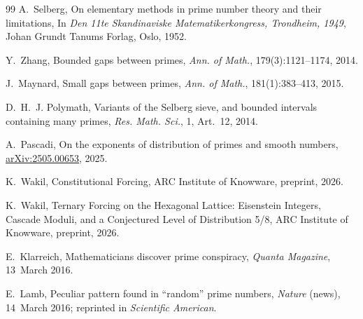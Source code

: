 \documentclass[12pt,a4paper]{article}
\theoremstyle{plain}
\theoremstyle{definition}
\theoremstyle{remark}
\begin{document}
\begin{thebibliography}{99}
A.~Selberg,
\newblock On elementary methods in prime number theory and their limitations,
\newblock In \emph{Den 11te Skandinaviske Matematikerkongress, Trondheim, 1949},
  Johan Grundt Tanums Forlag, Oslo, 1952.

Y.~Zhang,
\newblock Bounded gaps between primes,
\newblock \emph{Ann. of Math.}, 179(3):1121--1174, 2014.

J.~Maynard,
\newblock Small gaps between primes,
\newblock \emph{Ann. of Math.}, 181(1):383--413, 2015.

D.~H.~J. Polymath,
\newblock Variants of the Selberg sieve, and bounded intervals containing many
  primes,
\newblock \emph{Res. Math. Sci.}, 1, Art.~12, 2014.

A.~Pascadi,
\newblock On the exponents of distribution of primes and smooth numbers,
\newblock \href{https://arxiv.org/abs/2505.00653}{arXiv:2505.00653}, 2025.

K.~Wakil,
\newblock Constitutional Forcing,
\newblock ARC Institute of Knowware, preprint, 2026.

K.~Wakil,
\newblock Ternary Forcing on the Hexagonal Lattice: Eisenstein Integers, Cascade
  Moduli, and a Conjectured Level of Distribution 5/8,
\newblock ARC Institute of Knowware, preprint, 2026.

E.~Klarreich,
\newblock Mathematicians discover prime conspiracy,
\newblock \emph{Quanta Magazine}, 13~March 2016.

E.~Lamb,
\newblock Peculiar pattern found in ``random'' prime numbers,
\newblock \emph{Nature} (news), 14~March 2016; reprinted in \emph{Scientific
  American}.

\end{thebibliography}
\end{document}
